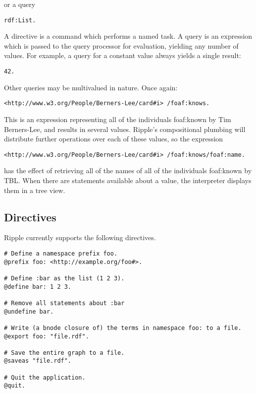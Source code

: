 \documentclass[runningheads]{llncs}
\begin{document}
or a query

\begin{verbatim}
rdf:List.
\end{verbatim}

A directive is a command which performs a named task.  A query is an expression which is passed to the query processor for evaluation, yielding any number of values.  For example, a query for a constant value always yields a single result:

\begin{verbatim}
42.
\end{verbatim}

Other queries may be multivalued in nature.  Once again:

\begin{verbatim}
<http://www.w3.org/People/Berners-Lee/card#i> /foaf:knows.
\end{verbatim}

This is an expression representing all of the individuals foaf:known by Tim
Berners-Lee, and results in several values.  Ripple's compositional plumbing
will distribute further operations over each of these values, so the expression

\begin{verbatim}
<http://www.w3.org/People/Berners-Lee/card#i> /foaf:knows/foaf:name.
\end{verbatim}

has the effect of retrieving all of the names of all of the individuals
foaf:known by TBL.  When there are statements available about a value, the
interpreter displays them in a tree view.


\subsection{Directives}

Ripple currently supports the following directives.
\newline

\begin{verbatim}
# Define a namespace prefix foo.
@prefix foo: <http://example.org/foo#>.

# Define :bar as the list (1 2 3).
@define bar: 1 2 3.

# Remove all statements about :bar
@undefine bar.

# Write (a bnode closure of) the terms in namespace foo: to a file.
@export foo: "file.rdf".

# Save the entire graph to a file.
@saveas "file.rdf".

# Quit the application.
@quit.
\end{verbatim}
\end{document}

